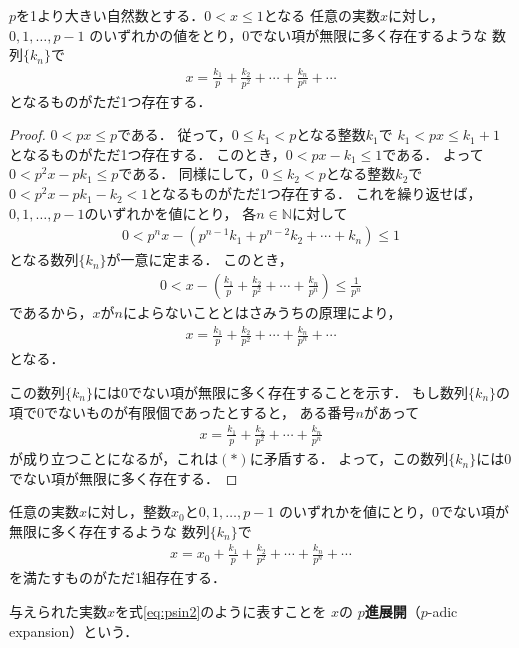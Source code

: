      \begin{thm} \label{thm:psintenkai}
       $p$を1より大きい自然数とする．$0 < x \leq 1$となる
       任意の実数$x$に対し，$0,  1,  \ldots ,  p-1$
       のいずれかの値をとり，0でない項が無限に多く存在するような
       数列$\{ k_n \}$で
       \begin{align*}
         x = \frac{k_1}{p} + \frac{k_2}{p^2} + \cdots + \frac{k_n}{p^n} + \cdots
       \end{align*}
       となるものがただ1つ存在する．
     \end{thm}

     \begin{proof}
       $0 < px \leq p$である．
       従って，$0 \leq  k_1 < p$となる整数$k_1$で
       $k_1 < px \leq k_1 +1$となるものがただ1つ存在する．
       このとき，$0< px-k_1 \leq 1$である．
       よって$0< p^2 x - p k_1 \leq p$である．
       同様にして，$0 \leq k_2 < p$となる整数$k_2$で
       $0<p^2 x - pk_1 - k_2 < 1$となるものがただ1つ存在する．
       これを繰り返せば，$0,  1,  \ldots ,  p-1$のいずれかを値にとり，
       各$n \in \mathbb{N}$に対して
       \begin{align*}
         0< p^nx - (p^{n-1} k_1 + p^{n-2} k_2 + \cdots + k_n ) \leq 1
       \end{align*}
       となる数列$\{ k_n \}$が一意に定まる．
       このとき，
       \begin{align}
         0< x - \left( \frac{k_1}{p} + \frac{k_2}{p^2} + \cdots + \frac{k_n}{p^n}
         \right) \leq \frac{1}{p^n} \tag{$\ast$}
       \end{align}
       であるから，$x$が$n$によらないこととはさみうちの原理により，
       \begin{align*}
         x= \frac{k_1}{p} + \frac{k_2}{p^2} + \cdots + \frac{k_n}{p^n} + \cdots 
       \end{align*}
       となる．

       この数列$\{ k_n \}$には0でない項が無限に多く存在することを示す．
       もし数列$\{ k_n \}$の項で0でないものが有限個であったとすると，
       ある番号$n$があって
       \begin{align*}
         x = \frac{k_1}{p} + \frac{k_2}{p^2} + \cdots + \frac{k_n}{p^n} 
       \end{align*}
       が成り立つことになるが，これは$(\ast)$に矛盾する．
       よって，この数列$\{ k_n \}$には0でない項が無限に多く存在する．
     \end{proof}
     \begin{coro}
       任意の実数$x$に対し，整数$x_0$と$0 ,  1,  \ldots ,  p-1$
       のいずれかを値にとり，0でない項が無限に多く存在するような
       数列$\{ k_n \}$で
       \begin{align}
         x = x_0 + \frac{k_1}{p} + \frac{k_2}{p^2} + \cdots + \frac{k_n}{p^n} + \cdots 
         \label{eq:psin2}
       \end{align}
       を満たすものがただ1組存在する．
     \end{coro}
     与えられた実数$x$を式\eqref{eq:psin2}のように表すことを
     $x$の
     \textbf{$p$進展開}（$p$-adic expansion）という．

